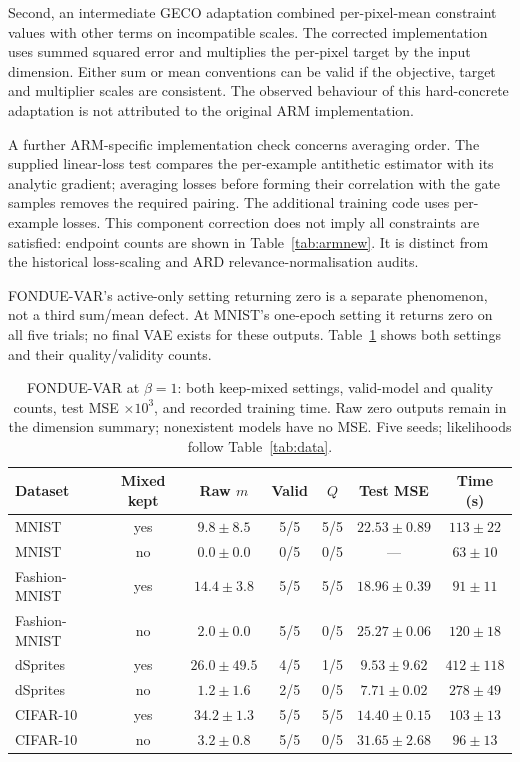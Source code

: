 \documentclass[make,article,submit,pdftex,moreauthors]{Definitions/mdpi}
\begin{document}
Second, an intermediate GECO adaptation combined per-pixel-mean
constraint values with other terms on incompatible scales. The corrected
implementation uses summed squared error and multiplies the per-pixel
target by the input dimension. Either sum or mean conventions can be
valid if the objective, target and multiplier scales are consistent.
The observed behaviour of this hard-concrete adaptation is not attributed
to the original ARM implementation.

A further ARM-specific implementation check concerns averaging order.
The supplied linear-loss test compares the per-example antithetic
estimator with its analytic gradient; averaging losses before forming
their correlation with the gate samples removes the required pairing.
The additional training code uses per-example losses. This component
correction does not imply all constraints are satisfied: endpoint
counts are shown in Table~\ref{tab:armnew}. It is distinct from the
historical loss-scaling and ARD relevance-normalisation audits.

FONDUE-VAR's active-only setting returning zero is a separate phenomenon,
not a third sum/mean defect. At MNIST's one-epoch setting it returns zero
on all five trials; no final VAE exists for these outputs.
Table~\ref{tab:var} shows both settings and their quality/validity counts.

\begin{table}[H]
\caption{FONDUE-VAR at $\beta=1$: both keep-mixed settings, valid-model and quality counts, test MSE $\times10^3$, and recorded training time. Raw zero outputs remain in the dimension summary; nonexistent models have no MSE. Five seeds; likelihoods follow Table~\ref{tab:data}.}\label{tab:var}
\footnotesize
\setlength{\tabcolsep}{3.5pt}
\begin{tabular*}{\textwidth}{@{\extracolsep{\fill}}lcccccc@{}}
\toprule
Dataset & Mixed kept & Raw $m$ & Valid & $Q$ & Test MSE & Time (s) \\
\midrule
MNIST & yes & $9.8 \pm 8.5$ & 5/5 & 5/5 & $22.53 \pm 0.89$ & $113 \pm 22$ \\
MNIST & no & $0.0 \pm 0.0$ & 0/5 & 0/5 & --- & $63 \pm 10$ \\
Fashion-MNIST & yes & $14.4 \pm 3.8$ & 5/5 & 5/5 & $18.96 \pm 0.39$ & $91 \pm 11$ \\
Fashion-MNIST & no & $2.0 \pm 0.0$ & 5/5 & 0/5 & $25.27 \pm 0.06$ & $120 \pm 18$ \\
dSprites & yes & $26.0 \pm 49.5$ & 4/5 & 1/5 & $9.53 \pm 9.62$ & $412 \pm 118$ \\
dSprites & no & $1.2 \pm 1.6$ & 2/5 & 0/5 & $7.71 \pm 0.02$ & $278 \pm 49$ \\
CIFAR-10 & yes & $34.2 \pm 1.3$ & 5/5 & 5/5 & $14.40 \pm 0.15$ & $103 \pm 13$ \\
CIFAR-10 & no & $3.2 \pm 0.8$ & 5/5 & 0/5 & $31.65 \pm 2.68$ & $96 \pm 13$ \\
\bottomrule
\end{tabular*}
\end{table}
\end{document}
